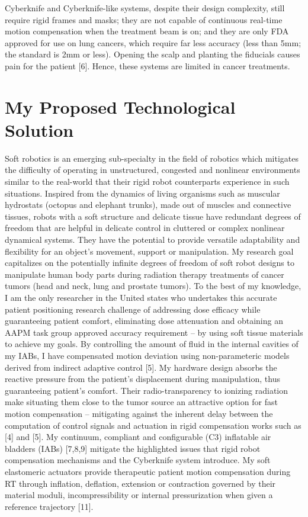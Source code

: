 \documentclass[12pt,a4paper]{article}
\begin{document}
Cyberknife and Cyberknife-like systems, despite their design complexity, still require rigid frames and masks; they are not capable of continuous real-time motion compensation when the treatment beam is on; and they are only FDA approved for use on lung cancers, which require far less accuracy (less than 5mm; the standard is 2mm or less).  Opening the scalp and planting the fiducials causes pain for the patient [6]. Hence, these systems are limited in cancer treatments.

\section{My Proposed Technological Solution}
Soft robotics is an emerging sub-specialty in the field of robotics which mitigates the difficulty of operating in unstructured, congested and nonlinear environments similar to the real-world that their rigid robot counterparts experience in such situations. Inspired from the dynamics of living organisms such as muscular hydrostats (octopus and elephant trunks), made out of muscles and connective tissues, robots with a soft structure and delicate tissue have redundant degrees of freedom that are helpful in delicate control in cluttered or complex nonlinear dynamical systems. They have the potential to provide versatile adaptability and flexibility for an object’s movement, support or  manipulation. My research goal capitalizes on the potentially infinite degrees of freedom of soft robot designs to manipulate human body parts during radiation therapy treatments of cancer tumors (head and neck, lung and prostate tumors). To the best of my knowledge, I am the only researcher in the United states who undertakes this accurate patient positioning research challenge of addressing dose efficacy while guaranteeing patient comfort, eliminating dose attenuation and obtaining an AAPM task group approved accuracy requirement -- by using soft tissue materials to achieve my goals. By controlling the amount of fluid in the internal cavities of my IABs, I have compensated motion deviation using non-parameteric models derived from indirect adaptive control [5]. My hardware design absorbs the reactive pressure from the patient's displacement during manipulation, thus guaranteeing patient's comfort. Their radio-transparency to ionizing radiation make situating them close to the tumor source an attractive option for fast motion compensation -- mitigating against the inherent delay between the computation of control signals and actuation in rigid compensation works such as [4] and [5].  My continuum, compliant and configurable (C3) inflatable air bladders (IABs) [7,8,9] mitigate the highlighted issues that rigid robot compensation mechanisms and the Cyberknife system introduce. My soft elastomeric actuators  provide therapeutic patient motion compensation during RT through inflation, deflation, extension or contraction governed by their material moduli, incompressibility or internal pressurization when given a reference trajectory [11].
\end{document}
